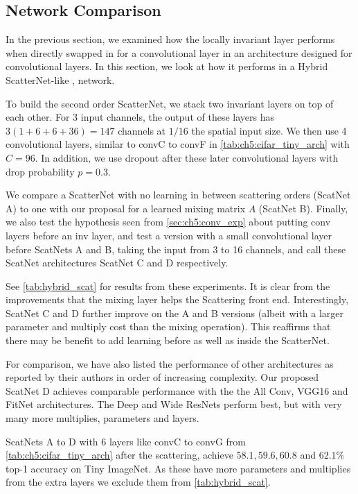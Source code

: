 

\subsection{Network Comparison}\label{sec:scat_exp}
In the previous section, we examined how the locally invariant layer performs when
directly swapped in for a convolutional layer in an architecture designed
for convolutional layers. In this section, we look at how
it performs in a Hybrid ScatterNet-like \cite{oyallon_hybrid_2017,oyallon_scaling_2017},
network.

To build the second order ScatterNet, we stack two invariant layers on top of each
other. For 3 input channels, the output of these layers has $3(1 +
6 + 6 +36) = 147$ channels at $1/16$ the spatial input size. We then use 4
convolutional layers, similar to convC to convF in \autoref{tab:ch5:cifar_tiny_arch} with
$C=96$. In addition, we use dropout after these later convolutional layers with
drop probability $p=0.3$.

We compare a ScatterNet with no learning in between scattering orders
(ScatNet A) to one with our proposal for a learned mixing matrix $A$ (ScatNet B). Finally,
we also test the hypothesis seen from \autoref{sec:ch5:conv_exp} about putting conv
layers before an inv layer, and test a version with a small convolutional layer
before ScatNets A and B, taking the input from 3 to 16 channels, and call these ScatNet
architectures ScatNet C and D respectively.

See \autoref{tab:hybrid_scat} for results from these experiments. It is clear from
the improvements that the mixing layer helps the Scattering front end.
Interestingly, ScatNet C and D further improve on the A and B versions
(albeit with a larger parameter and multiply cost than the mixing operation). This reaffirms that there
may be benefit to add learning before as well as inside the ScatterNet.

For comparison, we have also listed the performance of other architectures as
reported by their authors in order of increasing complexity. Our proposed ScatNet D achieves
comparable performance with the the All Conv, VGG16 and FitNet architectures.
The Deep\cite{he_identity_2016} and Wide\cite{zagoruyko_wide_2016}
ResNets perform best, but with very many more
multiplies, parameters and layers.

ScatNets A to D with 6 layers like convC to convG from \autoref{tab:ch5:cifar_tiny_arch} after
the scattering, achieve $58.1, 59.6, 60.8$ and $62.1\%$ top-1 accuracy on Tiny ImageNet. As
these have more parameters and multiplies from the extra layers we exclude them
from \autoref{tab:hybrid_scat}.


